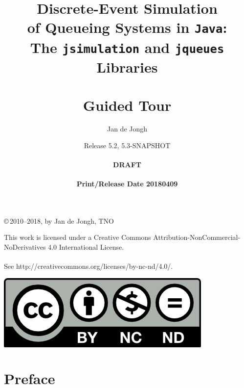 \documentclass[12pt]{book}
\title{Discrete-Event Simulation\\
       of Queueing Systems in \texttt{Java}:\\
       The \texttt{jsimulation}
       and
       \texttt{jqueues}
       Libraries\\
       \mbox{ } \\
       Guided Tour}
\author{Jan de Jongh}
\date{Release 5.2, 5.3-SNAPSHOT\\
	  \mbox{ } \\
	  {\bf DRAFT}\\
	  \mbox{ }
	  \\{\bf Print/Release Date 20180409}}
\begin{document}
\maketitle

{%
	\vspace*{90mm}
	\thispagestyle{empty}
	\setlength{\parindent}{0pt}
	\copyright\,2010--2018, by Jan de Jongh, TNO
	\vspace*{25mm}
}%

\begin{mdframed}[
  outerlinecolor=black,
  outerlinewidth=2pt,
  linecolor=cccolor,
  middlelinewidth=3pt,
  roundcorner=10pt]
This work is licensed under a Creative Commons
  Attribution-NonCommercial-NoDerivatives
  4.0 International License.\\
  \\
See http://creativecommons.org/licenses/by-nc-nd/4.0/.
  \\
\begin{center}
  \includegraphics[scale=2]{fig/by-nc-nd}
\end{center}
\end{mdframed}



\chapter*{Preface}
\label{chap:preface}

\end{document}
